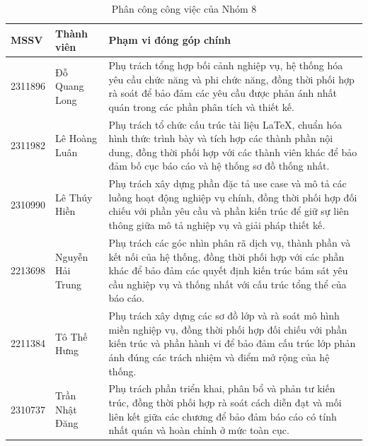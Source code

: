 \begin{table}[H]
\centering
\caption{Phân công công việc của Nhóm 8}
\small
\begin{tabularx}{\textwidth}{|p{1.9cm}|p{3.2cm}|X|}
\hline
\textbf{MSSV} & \textbf{Thành viên} & \textbf{Phạm vi đóng góp chính} \\
\hline
2311896 & Đỗ Quang Long &
Phụ trách tổng hợp bối cảnh nghiệp vụ, hệ thống hóa yêu cầu chức năng và phi chức năng, đồng thời phối hợp rà soát để bảo đảm các yêu cầu được phản ánh nhất quán trong các phần phân tích và thiết kế. \\
\hline
2311982 & Lê Hoàng Luân &
Phụ trách tổ chức cấu trúc tài liệu LaTeX, chuẩn hóa hình thức trình bày và tích hợp các thành phần nội dung, đồng thời phối hợp với các thành viên khác để bảo đảm bố cục báo cáo và hệ thống sơ đồ thống nhất. \\
\hline
2310990 & Lê Thúy Hiền &
Phụ trách xây dựng phần đặc tả use case và mô tả các luồng hoạt động nghiệp vụ chính, đồng thời phối hợp đối chiếu với phần yêu cầu và phần kiến trúc để giữ sự liên thông giữa mô tả nghiệp vụ và giải pháp thiết kế. \\
\hline
2213698 & Nguyễn Hải Trung &
Phụ trách các góc nhìn phân rã dịch vụ, thành phần và kết nối của hệ thống, đồng thời phối hợp với các phần khác để bảo đảm các quyết định kiến trúc bám sát yêu cầu nghiệp vụ và thống nhất với cấu trúc tổng thể của báo cáo. \\
\hline
2211384 & Tô Thế Hưng &
Phụ trách xây dựng các sơ đồ lớp và rà soát mô hình miền nghiệp vụ, đồng thời phối hợp đối chiếu với phần kiến trúc và phần hành vi để bảo đảm cấu trúc lớp phản ánh đúng các trách nhiệm và điểm mở rộng của hệ thống. \\
\hline
2310737 & Trần Nhật Đăng &
Phụ trách phần triển khai, phân bổ và phản tư kiến trúc, đồng thời phối hợp rà soát cách diễn đạt và mối liên kết giữa các chương để bảo đảm báo cáo có tính nhất quán và hoàn chỉnh ở mức toàn cục. \\
\hline
\end{tabularx}
\normalsize
\end{table}
